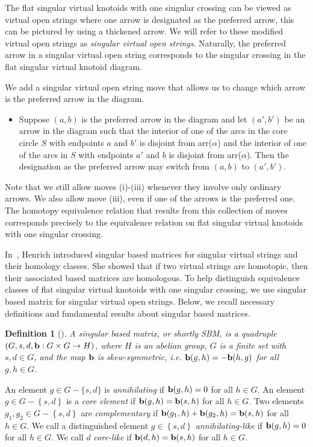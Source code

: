 \documentclass[11pt]{amsart}
\theoremstyle{noparens}
\newtheorem{definition}{Definition}[section]
\numberwithin{equation}{section}
\numberwithin{equation}{section}
\begin{document}
The flat singular virtual knotoids with one singular crossing can be viewed as virtual open strings where one arrow is designated as the preferred arrow, this can be pictured by using a thickened arrow. We will refer to these modified virtual open strings as \textit{singular virtual open strings}. Naturally, the preferred arrow in a singular virtual open string corresponds to the singular crossing in the flat singular virtual knotoid diagram.

We add a singular virtual open string move that allows us to change which arrow is the preferred arrow in the diagram.  
\begin{itemize}
\item[(s-ii)] Suppose $(a,b)$ is the preferred arrow in the diagram and let $(a',b')$ be an arrow in the diagram such that the interior of one of the arcs in the core circle $S$ with endpoints $a$ and $b'$ is disjoint from arr($\alpha$) and the interior of one of the arcs in $S$ with endpoints $a'$ and $b$ is disjoint from arr($\alpha$). Then the designation as the preferred arrow may switch from $(a,b)$ to $(a',b')$. 
\end{itemize}

Note that we still allow moves (i)-(iii) whenever they involve only ordinary arrows. We also allow move (iii), even if one of the arrows is the preferred one. The homotopy equivalence relation that results from this collection of moves corresponds precisely to the equivalence relation on flat singular virtual knotoids with one singular crossing.

In~\cite{Hen}, Henrich introduced singular based matrices for singular virtual strings and their homology classes. She  showed that if two virtual strings are homotopic, then their associated based matrices are homologous. To help distinguish equivalence classes of flat singular virtual knotoids with one singular crossing, we use singular based matrix for singular virtual open strings. Below, we recall necessary definitions and fundamental results about singular based matrices. 

\begin{definition} [\cite{Hen}] {\rm 
A \textit{singular based matrix}, or shortly SBM, is a quadruple $(G, s, d, {\bf b} : G \times G \to H)$, where $H$ is an abelian group, $G$ is a finite set with $s, d\in G$, and the map ${\bf b}$ is skew-symmetric, i.e. ${\bf b}(g,h) = -{\bf b}(h,g)$ for all $g, h \in G$.
} 
\end{definition}

An element $g \in G - \{s, d\}$ is \textit{annihilating} if ${\bf b}(g, h) = 0$ for all $h\in G$. An element $g\in G - \left\{s, d\right\}$ is a \textit{core element} if ${\bf b}(g, h) = {\bf b}(s, h)$ for all $h\in G$. Two elements $g_1, g_2\in G - \left\{s, d\right\}$ are \textit{complementary} if ${\bf b}(g_1, h) + {\bf b}(g_2, h) = {\bf b}(s, h)$ for all $h\in G$. We call a distinguished element $g\in \left\{s, d\right\}$  \textit{annihilating-like} if ${\bf b}(g, h) = 0$ for all $h\in G$. We call $d$ \textit{core-like} if ${\bf b}(d, h) = {\bf b}(s, h)$ for all $h\in G$.
\end{document}
